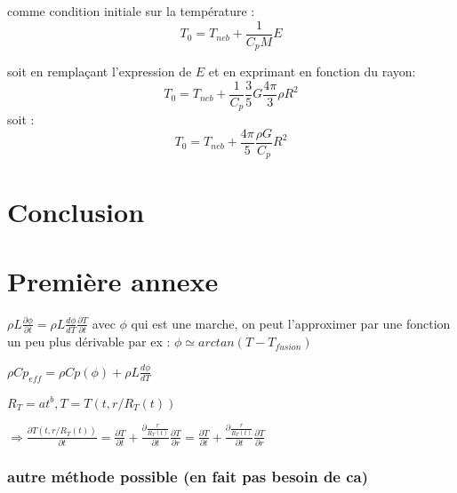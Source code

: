 \documentclass[10pt,a4paper]{article}
\numberwithin{equation}{section}
\begin{document}
comme condition initiale sur la température :
$$T_0=T_{neb} + \frac{1}{C_p M} E$$

soit en remplaçant l'expression de $E$ et en exprimant en fonction du rayon:
$$T_0 = T_{neb} + \frac{1}{C_p} \frac{3}{5}G\frac{4\pi}{3}\rho R^2$$
soit :
$$T_0 = T_{neb} + \frac{4\pi}{5}\frac{\rho G}{C_p} R^2$$




\section*{Conclusion}






\newpage
\appendix
\section{Première annexe} \label{annexe_fonctionnelles}
$ \rho L \frac{\partial \phi}{\partial t} = \rho L \frac{d \phi}{d T}\frac{\partial T}{\partial t} $ avec $\phi$ qui est une marche, on peut l'approximer par une fonction un peu plus dérivable par ex :  $\phi \simeq arctan(T-T_{fusion})$ 

$ \rho Cp_{eff} = \rho Cp(\phi) + \rho L  \frac{d \phi}{d T}$



$R_T = a t^b , T = T(t,r/R_T(t)) $

$\Rightarrow \frac{\partial T(t,r/R_T(t))}{\partial t}  = \frac{\partial T}{\partial t} + \frac{\partial \frac{r}{R_T(t)}}{\partial t}\frac{\partial T}{\partial r} = \frac{\partial T}{\partial t} + \frac{\partial \frac{r}{R_T(t)}}{\partial t}\frac{\partial T}{\partial r} $


\subsubsection{autre méthode possible (en fait pas besoin de ca)}
\end{document}

